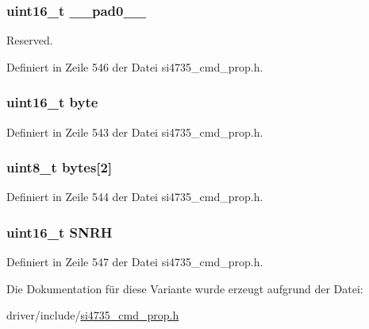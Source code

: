 \subsubsection[{\+\_\+\+\_\+pad0\+\_\+\+\_\+}]{\setlength{\rightskip}{0pt plus 5cm}uint16\+\_\+t \+\_\+\+\_\+pad0\+\_\+\+\_\+}\label{unionfm__rsq__snr__hi__thres_a77132c2c26a75f5b8751b235cda23828}


Reserved. 



Definiert in Zeile 546 der Datei si4735\+\_\+cmd\+\_\+prop.\+h.

\hypertarget{unionfm__rsq__snr__hi__thres_ab0549c1b5ea980a02e7eab77e21fea49}{}
\subsubsection[{byte}]{\setlength{\rightskip}{0pt plus 5cm}uint16\+\_\+t byte}\label{unionfm__rsq__snr__hi__thres_ab0549c1b5ea980a02e7eab77e21fea49}


Definiert in Zeile 543 der Datei si4735\+\_\+cmd\+\_\+prop.\+h.

\hypertarget{unionfm__rsq__snr__hi__thres_a46e4c05d20a047ec169f60d3167e912e}{}
\subsubsection[{bytes}]{\setlength{\rightskip}{0pt plus 5cm}uint8\+\_\+t bytes\mbox{[}2\mbox{]}}\label{unionfm__rsq__snr__hi__thres_a46e4c05d20a047ec169f60d3167e912e}


Definiert in Zeile 544 der Datei si4735\+\_\+cmd\+\_\+prop.\+h.

\hypertarget{unionfm__rsq__snr__hi__thres_ad10645239ad4d7fb5b5f61a834285bb9}{}
\subsubsection[{S\+N\+R\+H}]{\setlength{\rightskip}{0pt plus 5cm}uint16\+\_\+t S\+N\+R\+H}\label{unionfm__rsq__snr__hi__thres_ad10645239ad4d7fb5b5f61a834285bb9}


Definiert in Zeile 547 der Datei si4735\+\_\+cmd\+\_\+prop.\+h.



Die Dokumentation für diese Variante wurde erzeugt aufgrund der Datei\+:\begin{DoxyCompactItemize}
\item 
driver/include/\hyperlink{si4735__cmd__prop_8h}{si4735\+\_\+cmd\+\_\+prop.\+h}\end{DoxyCompactItemize}
